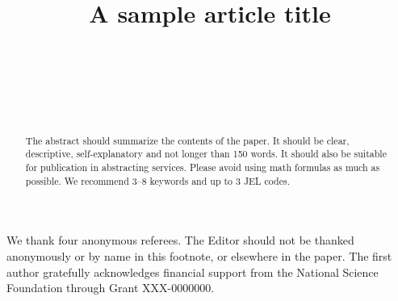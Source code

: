 \documentclass[qe,nameyear,draft]{econsocart}
\theoremstyle{plain}
\begin{document}
\begin{frontmatter}

\title{A sample article title}

\begin{aug}
%
%
%
\author[add1,add11]{~}
\author[add2]{~}
\author[add2]{~}
\address[add1]{%
,
}

\address[add11]{%
,
}

\address[add2]{%
,
}

\end{aug}

\begin{funding}
We thank four anonymous referees. The Editor should not be thanked anonymously or by name in this footnote, or elsewhere in the paper. The first author gratefully acknowledges financial support from the National Science Foundation through Grant XXX-0000000.
\end{funding}
%

\begin{abstract}
The abstract should summarize the contents of the paper. It should be clear, descriptive, self-explanatory and not longer than 150 words. It should also be suitable for publication in abstracting services. Please avoid using math formulas as much as possible. We recommend 3--8 keywords and up to 3 JEL codes.
\end{abstract}

\begin{keyword}
\end{keyword}

\begin{keyword}[class=JEL] %
\end{keyword}

\end{frontmatter}
\end{document}
